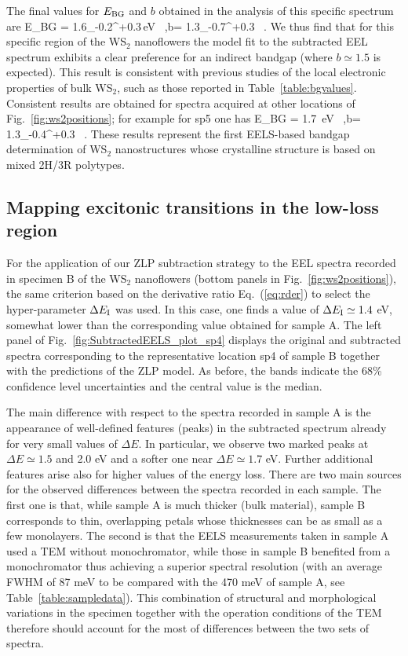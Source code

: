 The final values for $E_{\rm BG}$ and $b$ obtained in the analysis of this specific spectrum are
\be
E_{\rm BG} = 1.6_{-0.2}^{+0.3}\,{\rm eV} \, ,\quad b= 1.3_{-0.7}^{+0.3} \, .
\ee
We thus find that for this specific region of the WS$_2$ nanoflowers
the model fit to the subtracted EEL spectrum exhibits a clear preference
for an indirect bandgap (where $b\simeq 1.5$ is expected).
%
This result is consistent with previous studies of the local
electronic properties of bulk WS$_2$, such as those reported in Table~\ref{table:bgvalues}.
%
Consistent results are obtained for spectra acquired at
other locations of Fig.~\ref{fig:ws2positions}; for example for sp5 one has
\be
E_{\rm BG} = 1.7 \,{\rm eV} \, ,\quad b= 1.3_{-0.4}^{+0.3} \, .
\ee
%
These results represent the first EELS-based bandgap determination of WS$_2$ nanostructures
whose crystalline structure is based on mixed 2H/3R polytypes.

\subsection{Mapping excitonic transitions in the low-loss region}

For the application of our ZLP subtraction strategy to the EEL spectra recorded in specimen B
of the WS$_2$ nanoflowers (bottom panels
in  Fig.~\ref{fig:ws2positions}), the same criterion
based on the derivative ratio Eq.~(\ref{eq:rder}) to select the hyper-parameter $\Delta E_{\rm I}$ was
used.
%
In this case, one finds a value of $\Delta E_{\rm I}\simeq 1.4$ eV,
 somewhat lower than the corresponding value obtained for sample A.
%
The left panel of Fig.~\ref{fig:SubtractedEELS_plot_sp4} displays
the original
and subtracted spectra corresponding to the representative
location sp4 of sample B
together with the predictions of the ZLP model.
%
As before, the bands indicate the 68\% confidence level uncertainties
and the central value is the median.

The main difference with respect to the spectra recorded in sample A is the appearance
of well-defined features (peaks) in the subtracted spectrum already for
very small values of $\Delta E$.
%
In particular, we observe two marked peaks at $\Delta E\simeq 1.5$ and 2.0 eV and a
softer one near $\Delta E \simeq 1.7$ eV.
%
Further additional features arise also for higher values of the energy loss.
%
There are two main sources for the observed differences between the spectra recorded
in each sample.
%
The first one is that, while sample A is much thicker (bulk material), sample B corresponds
to thin, overlapping petals whose thicknesses can be as small as a few monolayers.
%
The second is that the EELS measurements taken in sample A used a TEM without monochromator,
while those in sample B benefited from a monochromator thus achieving a
superior
spectral resolution (with an average FWHM of 87 meV to be compared with the 470 meV of sample A, see
Table~\ref{table:sampledata}).
%
This combination of structural and morphological variations in the specimen together
with the operation conditions of the TEM therefore should account for the
most of differences
between the two sets of spectra.


